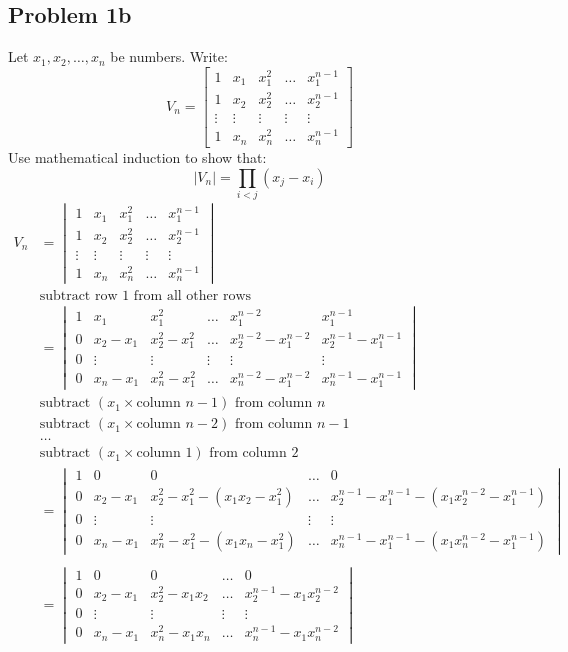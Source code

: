 \documentclass{math}
\begin{document}
\subsection*{Problem 1b}
Let \( x_1,x_2,\dots,x_n \) be numbers. Write:
\[ V_n = \begin{bmatrix}
  1 & x_1 & x_1^2 & \dots & x_1^{n-1} \\
  1 & x_2 & x_2^2 & \dots & x_2^{n-1} \\
  \vdots & \vdots & \vdots & \vdots & \vdots \\
  1 & x_n & x_n^2 & \dots & x_n^{n-1}
\end{bmatrix} \]
Use mathematical induction to show that:
\[ |V_n| = \prod_{i<j}(x_j-x_i) \]
\begin{align*}
  V_n &= \begin{vmatrix}
    1 & x_1 & x_1^2 & \dots & x_1^{n-1} \\
    1 & x_2 & x_2^2 & \dots & x_2^{n-1} \\
    \vdots & \vdots & \vdots & \vdots & \vdots \\
    1 & x_n & x_n^2 & \dots & x_n^{n-1}
  \end{vmatrix} \\
  & \text{subtract row 1 from all other rows} \\
  &= \begin{vmatrix}
    1 & x_1 & x_1^2 & \dots & x_1^{n-2} & x_1^{n-1} \\
    0 & x_2-x_1 & x_2^2-x_1^2 & \dots & x_2^{n-2}-x_1^{n-2} &
      x_2^{n-1}-x_1^{n-1} \\
    0 & \vdots & \vdots & \vdots & \vdots & \vdots \\
    0 & x_n-x_1 & x_n^2-x_1^2 & \dots & x_n^{n-2}-x_1^{n-2} &
      x_n^{n-1}-x_1^{n-1}
  \end{vmatrix} \\
  & \text{subtract }(x_1\times\text{column }n-1) \text{ from column } n \\
  & \text{subtract }(x_1\times\text{column }n-2) \text{ from column } n-1 \\
  & \dots \\
  & \text{subtract }(x_1\times\text{column 1}) \text{ from column } 2 \\
  &= \begin{vmatrix}
    1 & 0 & 0 & \dots & 0 \\
    0 & x_2-x_1 & x_2^2-x_1^2-(x_1x_2-x_1^2) & \dots &
      x_2^{n-1}-x_1^{n-1}-(x_1x_2^{n-2}-x_1^{n-1}) \\
    0 & \vdots & \vdots & \vdots & \vdots \\
    0 & x_n-x_1 & x_n^2-x_1^2-(x_1x_n-x_1^2) & \dots &
      x_n^{n-1}-x_1^{n-1}-(x_1x_n^{n-2}-x_1^{n-1})
  \end{vmatrix} \\ \\
  &= \begin{vmatrix}
    1 & 0 & 0 & \dots & 0 \\
    0 & x_2-x_1 & x_2^2-x_1x_2 & \dots & x_2^{n-1}-x_1x_2^{n-2} \\
    0 & \vdots & \vdots & \vdots & \vdots \\
    0 & x_n-x_1 & x_n^2-x_1x_n & \dots & x_n^{n-1}-x_1x_n^{n-2}
  \end{vmatrix}
\end{align*}
\end{document}
